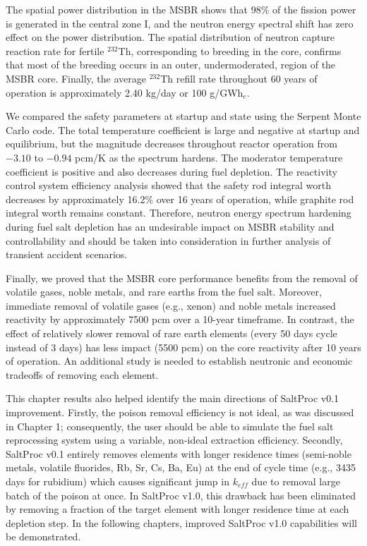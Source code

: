 The spatial power distribution in the \gls{MSBR} shows that 98\% of the 
fission power is generated in the central zone I, and the neutron energy 
spectral shift has zero effect on the power distribution. The 
spatial distribution of neutron capture reaction rate for fertile $^{232}$Th, 
corresponding to breeding in the core, confirms that most of the breeding 
occurs in an outer, undermoderated, region of the \gls{MSBR} core. Finally, 
the average $^{232}$Th refill rate throughout 60 years of operation is 
approximately 2.40 kg/day or 100 g/GWh$_e$.

We compared the safety parameters at startup and state using the Serpent Monte 
Carlo code. The total temperature coefficient is large and negative at startup 
and equilibrium, but the magnitude decreases throughout reactor operation from 
$-3.10$ to $-0.94$ pcm/K as the spectrum hardens. The moderator temperature 
coefficient is positive and also decreases during fuel depletion. The 
reactivity control system efficiency analysis showed that the safety rod 
integral worth decreases by approximately 16.2\% over 16 years of operation, 
while graphite rod integral worth remains constant. Therefore, neutron energy 
spectrum hardening during fuel salt depletion has an undesirable impact on 
\gls{MSBR} stability and controllability and should be taken into 
consideration in further analysis of transient accident scenarios.

Finally, we proved that the \gls{MSBR} core performance benefits from the 
removal of volatile gases, noble metals, and rare earths from the fuel salt. 
Moreover, immediate removal of volatile gases (e.g., xenon) and noble metals 
increased reactivity by approximately 7500 pcm over a 10-year timeframe. In 
contrast, the effect of relatively slower removal of rare earth elements 
(every 50 days cycle instead of 3 days) has less impact (5500 pcm) on the core 
reactivity after 10 years of operation. An additional study is needed to 
establish neutronic  and economic tradeoffs of removing each element.

This chapter results also helped identify the main directions of SaltProc v0.1 
improvement. Firstly, the poison removal efficiency is not ideal, as was 
discussed in Chapter 1; consequently, the user should be able to simulate the 
fuel salt reprocessing system using a variable, non-ideal extraction 
efficiency. Secondly, SaltProc v0.1 entirely removes elements with longer 
residence times (semi-noble metals, volatile fluorides, Rb, Sr, Cs, Ba, Eu) at 
the end of cycle time (e.g., 3435 days for rubidium) which causes significant  
jump in $k_{eff}$ due to removal large batch of the poison at once. In 
SaltProc v1.0, this drawback has been eliminated by removing a fraction of the 
target element with longer residence time at each depletion step. In the 
following chapters, improved SaltProc v1.0 capabilities will be demonstrated.